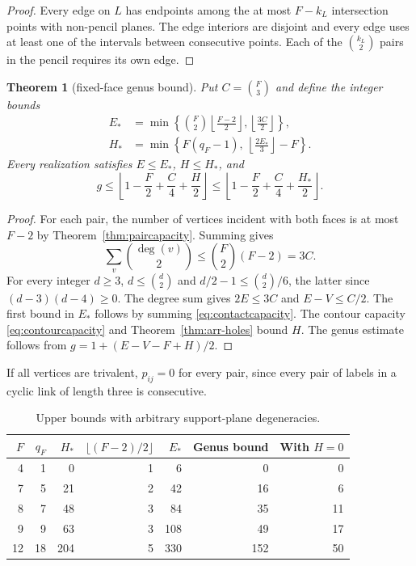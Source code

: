 \documentclass[11pt,a4paper]{article}
\newtheorem{theorem}{Theorem}[section]
\theoremstyle{definition}
\begin{document}
\begin{proof}
Every edge on $L$ has endpoints among the at most $F-k_L$ intersection
points with non-pencil planes. The edge interiors are disjoint and every
edge uses at least one of the intervals between consecutive points. Each
of the $\binom{k_L}{2}$ pairs in the pencil requires its own edge.
\end{proof}

\begin{theorem}[fixed-face genus bound]\label{thm:fixed-face}
Put $C=\binom{F}{3}$ and define the integer bounds
\begin{align}
 E_*&=\min\left\{\binom{F}{2}\left\lfloor\frac{F-2}{2}\right\rfloor,
                    \left\lfloor\frac{3C}{2}\right\rfloor\right\},\\
 H_*&=\min\left\{F(q_F-1),\ \left\lfloor\frac{2E_*}{3}\right\rfloor-F\right\}.
\end{align}
Every realization satisfies $E\le E_*$, $H\le H_*$, and
\begin{equation}\label{eq:Gdisk}
 g\leq \left\lfloor 1-\frac{F}{2}+\frac{C}{4}+\frac{H}{2}\right\rfloor
 \leq \left\lfloor 1-\frac{F}{2}+\frac{C}{4}+\frac{H_*}{2}\right\rfloor.
\end{equation}
\end{theorem}

\begin{proof}
For each pair, the number of vertices incident with both faces is at most
$F-2$ by Theorem~\ref{thm:paircapacity}. Summing gives
\[
 \sum_v\binom{\deg(v)}{2}\leq \binom{F}{2}(F-2)=3C .
\]
For every integer $d\geq3$, $d\leq\binom{d}{2}$ and
$d/2-1\leq\binom{d}{2}/6$, the latter since $(d-3)(d-4)\geq0$.
The degree sum gives $2E\leq3C$ and $E-V\leq C/2$. The first bound in
$E_*$ follows by summing \eqref{eq:contactcapacity}. The contour capacity
\eqref{eq:contourcapacity} and Theorem~\ref{thm:arr-holes} bound $H$.
The genus estimate follows from $g=1+(E-V-F+H)/2$.
\end{proof}

If all vertices are trivalent, $p_{ij}=0$ for every pair, since every pair of
labels in a cyclic link of length three is consecutive.

\begin{table}[ht]
\centering
\small
\begin{tabular}{rrrrrrr}
\toprule
$F$ & $q_F$ & $H_*$ & $\lfloor(F-2)/2\rfloor$ & $E_*$ &
Genus bound & With $H=0$\\
\midrule
4  & 1  & 0   & 1 & 6   & 0   & 0\\
7  & 5  & 21  & 2 & 42  & 16  & 6\\
8  & 7  & 48  & 3 & 84  & 35  & 11\\
9  & 9  & 63  & 3 & 108 & 49  & 17\\
12 & 18 & 204 & 5 & 330 & 152 & 50\\
\bottomrule
\end{tabular}
\caption{Upper bounds with arbitrary support-plane degeneracies.}
\label{tab:bounds}
\end{table}
\end{document}

